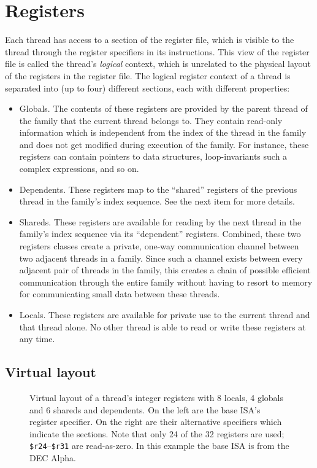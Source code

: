 \chapter{Registers}

Each thread has access to a section of the register file, which is visible to the thread through the register specifiers in its instructions. This view of the register file is called the thread's \emph{logical} context, which is unrelated to the physical layout of the registers in the register file. The logical register context of a thread is separated into (up to four) different sections, each with different properties:

\begin{itemize}
\item Globals. The contents of these registers are provided by the parent thread of the family that the current thread belongs to. They contain read-only information which is independent from the index of the thread in the family and does not get modified during execution of the family. For instance, these registers can contain pointers to data structures, loop-invariants such a complex expressions, and so on.
\item Dependents. These registers map to the ``shared'' registers of the previous thread in the family's index sequence. See the next item for more details.
\item Shareds. These registers are available for reading by the next thread in the family's index sequence via its ``dependent'' registers. Combined, these two registers classes create a private, one-way communication channel between two adjacent threads in a family. Since such a channel exists between every adjacent pair of threads in the family, this creates a chain of possible efficient communication through the entire family without having to resort to memory for communicating small data between these threads.
\item Locals. These registers are available for private use to the current thread and that thread alone. No other thread is able to read or write these registers at any time.
\end{itemize}

\section{Virtual layout}
\label{sec:registers-virtual-layout}

\begin{figure}
 \begin{center}
  
  \caption{Virtual layout of a thread's integer registers with 8 locals, 4 globals and 6 shareds and dependents. On the left are the base ISA's register specifier. On the right are their alternative specifiers which indicate the sections. Note that only 24 of the 32 registers are used; {\tt \$r24}--{\tt \$r31} are read-as-zero. In this example the base ISA is from the DEC Alpha.}
  \label{fig:regs-virtual}
 \end{center}
\end{figure}


